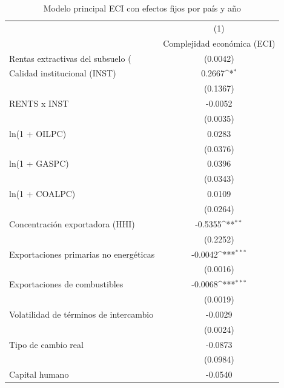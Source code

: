 \begin{table}[htbp]\centering
\def\sym#1{\ifmmode^{#1}\else\(^{#1}\)\fi}
\caption{Modelo principal ECI con efectos fijos por país y año}
\begin{tabular}{l*{1}{c}}
\toprule
                    &\multicolumn{1}{c}{(1)}\\
                    &\multicolumn{1}{c}{Complejidad económica (ECI)}\\
\midrule
Rentas extractivas del subsuelo (%
                    &    (0.0042)         \\
\addlinespace
Calidad institucional (INST)&      0.2667\sym{*}  \\
                    &    (0.1367)         \\
\addlinespace
RENTS x INST        &     -0.0052         \\
                    &    (0.0035)         \\
\addlinespace
ln(1 + OILPC)       &      0.0283         \\
                    &    (0.0376)         \\
\addlinespace
ln(1 + GASPC)       &      0.0396         \\
                    &    (0.0343)         \\
\addlinespace
ln(1 + COALPC)      &      0.0109         \\
                    &    (0.0264)         \\
\addlinespace
Concentración exportadora (HHI)&     -0.5355\sym{**} \\
                    &    (0.2252)         \\
\addlinespace
Exportaciones primarias no energéticas&     -0.0042\sym{***}\\
                    &    (0.0016)         \\
\addlinespace
Exportaciones de combustibles&     -0.0068\sym{***}\\
                    &    (0.0019)         \\
\addlinespace
Volatilidad de términos de intercambio&     -0.0029         \\
                    &    (0.0024)         \\
\addlinespace
Tipo de cambio real &     -0.0873         \\
                    &    (0.0984)         \\
\addlinespace
Capital humano      &     -0.0540         \\

\end{tabular}
\end{table}
